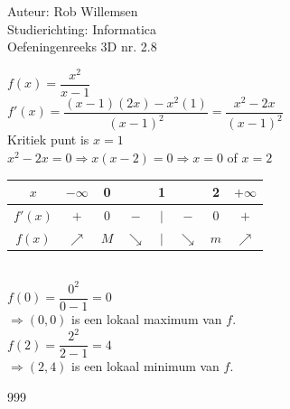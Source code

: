 \documentclass[a4paper]{article}
\begin{document}
\noindent \large Auteur: Rob Willemsen \\
\noindent \large Studierichting: Informatica \\
\noindent \large Oefeningenreeks 3D nr. 2.8 \\

\medskip

\normalsize

$f(x) = \dfrac{x^2}{x-1}$ \\

$f'(x) = \dfrac{(x-1)(2x) - x^2(1)}{(x-1)^2} = \dfrac{x^2 - 2x}{(x-1)^2}$ \\

Kritiek punt is $x = 1$ \\

$x^2 - 2x = 0 \Rightarrow x(x-2) = 0 \Rightarrow x = 0$ of $x = 2$ \\

\begin{tabular}{c|ccccccc}
$x$ & $-\infty$ & 0 & & 1 & & 2 & $+\infty$\\ \hline
$f'(x)$ & $+$ & $0$ & $-$ & $|$ & $-$ & $0$ & $+$ \\
$f(x)$ & $\nearrow$ & $M$ & $\searrow$ & $|$ & $\searrow$ & $m$ & $\nearrow$ \\ 
\end{tabular} \\

$f(0) = \dfrac{0^2}{0-1} = 0$ \\

$\Rightarrow (0,0)$ is een lokaal maximum van $f$. \\

$f(2) = \dfrac{2^2}{2-1} = 4$ \\

$\Rightarrow (2,4)$ is een lokaal minimum van $f$. \\

\begin{thebibliography}{999}
\end{thebibliography}
\end{document}
